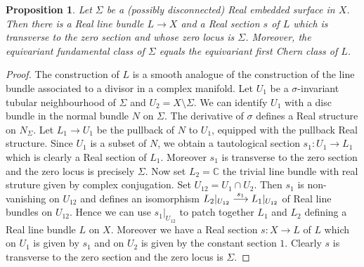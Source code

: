 \documentclass{amsart}
\newtheorem{proposition}[theorem]{Proposition}
\theoremstyle{definition}
\theoremstyle{remark}
\numberwithin{equation}{section}
\begin{document}
\begin{proposition}\label{prop:assL}
Let $\Sigma$ be a (possibly disconnected) Real embedded surface in $X$. Then there is a Real line bundle $L \to X$ and a Real section $s$ of $L$ which is transverse to the zero section and whose zero locus is $\Sigma$. Moreover, the equivariant fundamental class of $\Sigma$ equals the equivariant first Chern class of $L$.
\end{proposition}
\begin{proof}
The construction of $L$ is a smooth analogue of the construction of the line bundle associated to a divisor in a complex manifold. Let $U_1$ be a $\sigma$-invariant tubular neighbourhood of $\Sigma$ and $U_2 = X \setminus \Sigma$. We can identify $U_1$ with a disc bundle in the normal bundle $N$ on $\Sigma$. The derivative of $\sigma$ defines a Real structure on $N_\Sigma$. Let $L_1 \to U_1$ be the pullback of $N$ to $U_1$, equipped with the pullback Real structure. Since $U_1$ is a subset of $N$, we obtain a tautological section $s_1 : U_1 \to L_1$ which is clearly a Real section of $L_1$. Moreover $s_1$ is transverse to the zero section and the zero locus is precisely $\Sigma$. Now set $L_2 = \mathbb{C}$ the trivial line bundle with real struture given by complex conjugation. Set $U_{12} = U_1 \cap U_2$. Then $s_1$ is non-vanishing on $U_{12}$ and defines an isomorphism $L_2 |_{U_{12}} \buildrel s_1 \over \longrightarrow L_1|_{U_{12}}$ of Real line bundles on $U_{12}$. Hence we can use $s_1|_{U_{12}}$ to patch together $L_1$ and $L_2$ defining a Real line bundle $L$ on $X$. Moreover we have a Real section $s : X \to L$ of $L$ which on $U_1$ is given by $s_1$ and on $U_2$ is given by the constant section $1$. Clearly $s$ is transverse to the zero section and the zero locus is $\Sigma$.


\end{proof}
\end{document}

